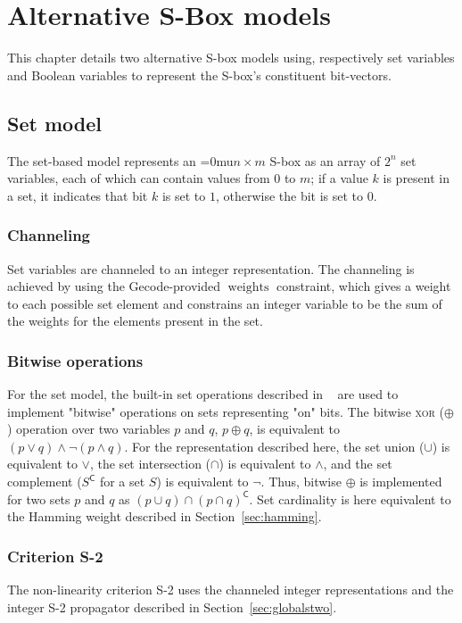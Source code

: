 \documentclass[a4paper,10pt,twoside,openright]{book}
\renewcommand{\sc}[1]{\textsc{\lowercase{#1}}}
\newcommand*\nbym{\begingroup\medmuskip=0mu\relax$n \times m$\endgroup}
\DeclareMathOperator{\weights}{weights}
\begin{document}
\chapter{Alternative S-Box models}
\label{sec:altmodels}
This chapter details two alternative S-box models using, respectively set variables and Boolean variables
to represent the S-box's constituent bit-vectors.

\section{Set model}
\label{sec:setmodel}
The set-based model represents an \nbym{} S-box as an array of $2^n$ set variables, 
each of which can contain values from $0$ to $m$; 
if a value $k$ is present in a set, it indicates that bit $k$ is set to $1$,
otherwise the bit is set to $0$.

\subsection{Channeling}
Set variables are channeled to an integer representation.
The channeling is achieved by using the Gecode-provided $\weights$ constraint, which gives a weight to each possible set element and constrains an integer variable to be the sum of the weights for the elements present in the set.

\subsection{Bitwise operations}
\label{sec:setbitwise}
For the set model, the built-in set operations described in
~\cite{MPG:M} 
are used to implement "bitwise" operations on sets representing "on" bits. 
The bitwise \sc{xor} ($\oplus$) operation over two variables $p$ and $q$, $p \oplus q$, 
is equivalent to $(p \lor q) \land \lnot(p \land q)$. 
For the representation described here, the set union ($\cup$) is equivalent to $\lor$, 
the set intersection ($\cap$) is equivalent to $\land$, 
and the set complement ($S^{\mathsf{C}}$ for a set $S$) is equivalent to $\lnot$. 
Thus, bitwise $\oplus$ is implemented for two sets $p$ and $q$ as
$(p \cup q) \cap (p \cap q)^{\mathsf{C}}$.
Set cardinality is here equivalent to the Hamming weight described in Section~\ref{sec:hamming}.

\subsection{Criterion S-2}
The non-linearity criterion S-2 uses the channeled integer representations 
and the integer S-2 propagator described in Section~\ref{sec:globalstwo}.
\end{document}
